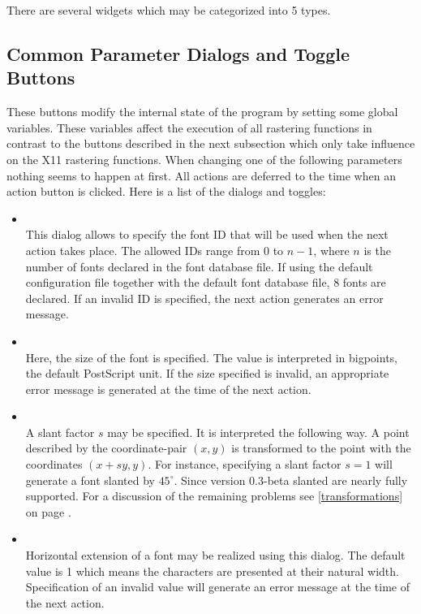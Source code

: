 There are several widgets which may be categorized into 5 types.

\subsection{Common Parameter Dialogs and Toggle Buttons}
These buttons modify the internal state of the program by setting some global
variables. These variables affect the execution of all rastering functions in
contrast to the buttons described in the next subsection which only take
influence on the X11 rastering functions. When changing
one of the following parameters nothing seems to happen at first. All
actions are deferred to the time when an action button is
clicked. Here is a list of the dialogs and toggles:
\begin{itemize}
\item {}\\
  This dialog allows to specify the font ID that will be used when
  the next action takes place. The allowed IDs range from 0 to $n-1$,
  where $n$ is the number of fonts declared in the font database
  file. If using the default configuration file together with the
  default font database file, 8 fonts are declared. If an invalid ID
  is specified, the next action generates an error message.
\item {}\\
  Here, the size of the font is specified. The value is interpreted in
  bigpoints, the default PostScript unit. If the size specified is
  invalid, an appropriate error message is generated at the time of
  the next action.
\item {}\\
  A slant factor $s$ may be specified. It is interpreted the following
  way. A point described by the coordinate-pair $(x,y)$ is transformed
  to the point with the coordinates $(x+sy,y)$. For instance,
  specifying a slant factor $s=1$ will generate a font slanted by
  $45^\circ$. Since version 0.3-beta slanted are nearly fully supported.
  For a discussion of the remaining problems see
  \ref{transformations} on page
  \pageref{transformations}. 
\item {}\\
  Horizontal extension of a font may be realized using this
  dialog. The default value is 1 which means the characters are
  presented at their natural width. Specification of an invalid value
  will generate an error message at the time of the next action.

\end{itemize}

